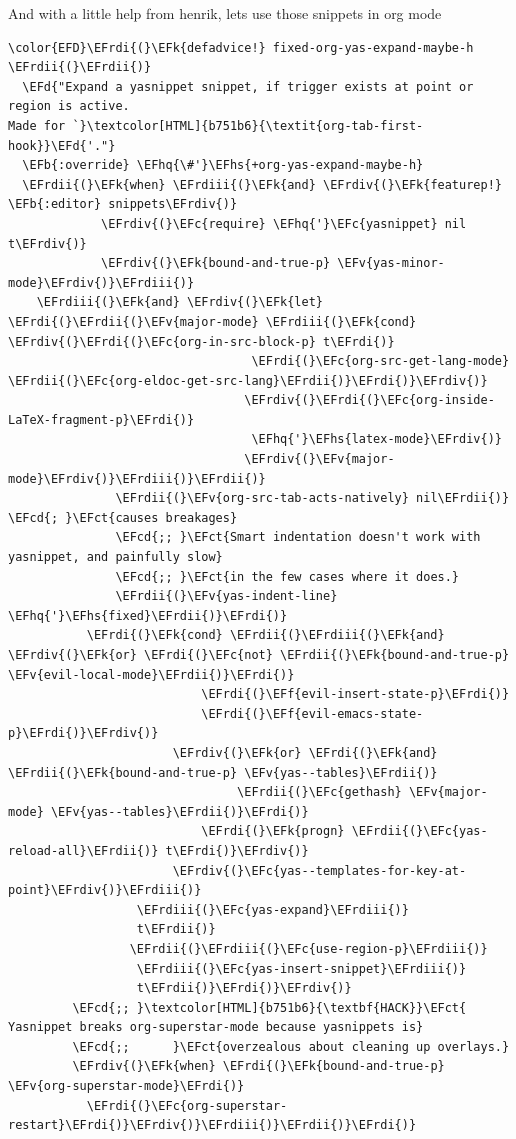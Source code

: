 \documentclass{scrartcl}
\newcommand{\EFk}[1]{\textcolor{EFk}{#1}} %
\newcommand{\EFd}[1]{\textcolor{EFd}{\textit{#1}}} %
\newcommand{\EFb}[1]{\textcolor{EFb}{#1}} %
\newcommand{\EFct}[1]{\textcolor{EFct}{#1}} %
\newcommand{\EFc}[1]{\textcolor{EFc}{#1}} %
\newcommand{\EFv}[1]{\textcolor{EFv}{#1}} %
\newcommand{\EFf}[1]{\textcolor{EFf}{#1}} %
\newcommand{\EFcd}[1]{\textcolor{EFcd}{#1}} %
\newcommand{\EFhq}[1]{\textcolor{EFhq}{#1}} %
\newcommand{\EFhs}[1]{\textcolor{EFhs}{#1}} %
\newcommand{\EFrdi}[1]{\textcolor{EFrdi}{#1}} %
\newcommand{\EFrdii}[1]{\textcolor{EFrdii}{#1}} %
\newcommand{\EFrdiii}[1]{\textcolor{EFrdiii}{#1}} %
\newcommand{\EFrdiv}[1]{\textcolor{EFrdiv}{#1}} %
\begin{document}
And with a little help from henrik, lets use those snippets in org mode
\begin{Code}
\begin{Verbatim}[]
\color{EFD}\EFrdi{(}\EFk{defadvice!} fixed-org-yas-expand-maybe-h \EFrdii{(}\EFrdii{)}
  \EFd{"Expand a yasnippet snippet, if trigger exists at point or region is active.
Made for `}\textcolor[HTML]{b751b6}{\textit{org-tab-first-hook}}\EFd{'."}
  \EFb{:override} \EFhq{\#'}\EFhs{+org-yas-expand-maybe-h}
  \EFrdii{(}\EFk{when} \EFrdiii{(}\EFk{and} \EFrdiv{(}\EFk{featurep!} \EFb{:editor} snippets\EFrdiv{)}
             \EFrdiv{(}\EFc{require} \EFhq{'}\EFc{yasnippet} nil t\EFrdiv{)}
             \EFrdiv{(}\EFk{bound-and-true-p} \EFv{yas-minor-mode}\EFrdiv{)}\EFrdiii{)}
    \EFrdiii{(}\EFk{and} \EFrdiv{(}\EFk{let} \EFrdi{(}\EFrdii{(}\EFv{major-mode} \EFrdiii{(}\EFk{cond} \EFrdiv{(}\EFrdi{(}\EFc{org-in-src-block-p} t\EFrdi{)}
                                  \EFrdi{(}\EFc{org-src-get-lang-mode} \EFrdii{(}\EFc{org-eldoc-get-src-lang}\EFrdii{)}\EFrdi{)}\EFrdiv{)}
                                 \EFrdiv{(}\EFrdi{(}\EFc{org-inside-LaTeX-fragment-p}\EFrdi{)}
                                  \EFhq{'}\EFhs{latex-mode}\EFrdiv{)}
                                 \EFrdiv{(}\EFv{major-mode}\EFrdiv{)}\EFrdiii{)}\EFrdii{)}
               \EFrdii{(}\EFv{org-src-tab-acts-natively} nil\EFrdii{)} \EFcd{; }\EFct{causes breakages}
               \EFcd{;; }\EFct{Smart indentation doesn't work with yasnippet, and painfully slow}
               \EFcd{;; }\EFct{in the few cases where it does.}
               \EFrdii{(}\EFv{yas-indent-line} \EFhq{'}\EFhs{fixed}\EFrdii{)}\EFrdi{)}
           \EFrdi{(}\EFk{cond} \EFrdii{(}\EFrdiii{(}\EFk{and} \EFrdiv{(}\EFk{or} \EFrdi{(}\EFc{not} \EFrdii{(}\EFk{bound-and-true-p} \EFv{evil-local-mode}\EFrdii{)}\EFrdi{)}
                           \EFrdi{(}\EFf{evil-insert-state-p}\EFrdi{)}
                           \EFrdi{(}\EFf{evil-emacs-state-p}\EFrdi{)}\EFrdiv{)}
                       \EFrdiv{(}\EFk{or} \EFrdi{(}\EFk{and} \EFrdii{(}\EFk{bound-and-true-p} \EFv{yas--tables}\EFrdii{)}
                                \EFrdii{(}\EFc{gethash} \EFv{major-mode} \EFv{yas--tables}\EFrdii{)}\EFrdi{)}
                           \EFrdi{(}\EFk{progn} \EFrdii{(}\EFc{yas-reload-all}\EFrdii{)} t\EFrdi{)}\EFrdiv{)}
                       \EFrdiv{(}\EFc{yas--templates-for-key-at-point}\EFrdiv{)}\EFrdiii{)}
                  \EFrdiii{(}\EFc{yas-expand}\EFrdiii{)}
                  t\EFrdii{)}
                 \EFrdii{(}\EFrdiii{(}\EFc{use-region-p}\EFrdiii{)}
                  \EFrdiii{(}\EFc{yas-insert-snippet}\EFrdiii{)}
                  t\EFrdii{)}\EFrdi{)}\EFrdiv{)}
         \EFcd{;; }\textcolor[HTML]{b751b6}{\textbf{HACK}}\EFct{ Yasnippet breaks org-superstar-mode because yasnippets is}
         \EFcd{;;      }\EFct{overzealous about cleaning up overlays.}
         \EFrdiv{(}\EFk{when} \EFrdi{(}\EFk{bound-and-true-p} \EFv{org-superstar-mode}\EFrdi{)}
           \EFrdi{(}\EFc{org-superstar-restart}\EFrdi{)}\EFrdiv{)}\EFrdiii{)}\EFrdii{)}\EFrdi{)}
\end{Verbatim}
\end{Code}
\end{document}
